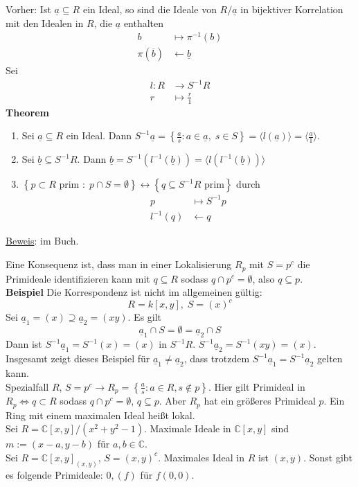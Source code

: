 \documentclass[a4paper, 12pt]{article}
\begin{document}
Vorher: Ist $\underline{a} \subseteq R$ ein Ideal, so sind die Ideale von $R/\underline{a}$ in bijektiver Korrelation mit den Idealen in $R$, die $\underline{a}$ enthalten \begin{align*}
	b & \mapsto \pi^{-1}(b)\\
	\pi(\overline{b}) &\gets \underline{b}
\end{align*}
Sei \begin{align*}
	l: R &\to S^{-1}R\\
	r &\mapsto \frac{r}{1}
\end{align*}
\textbf{Theorem}
\begin{enumerate}
	\item Sei $\underline{a} \subseteq R$ ein Ideal. Dann $S^{-1}\underline{a} = \left\{\frac{a}{s}: a \in \underline{a}, \; s \in S\right\} = \langle l(\underline{a})\rangle = \langle \frac{a}{1} \rangle$.
	\item Sei $\underline{b} \subseteq S^{-1}R$. Dann $\underline{b} = S^{-1}(l^{-1}(\underline{b})) = \langle l(l^{-1}(\underline{b})) \rangle$
	\item $\left\{p \subset R \text{ prim }: \; p \cap S = \emptyset\right\} \leftrightarrow \left\{q \subseteq S^{-1}R \text{ prim}\right\}$ durch \begin{align*}
		p &\mapsto S^{-1}p\\
		l^{-1}(q) &\gets q
	\end{align*}
\end{enumerate}
\underline{Beweis}: im Buch. 

Eine Konsequenz ist, dass man in einer Lokalisierung $R_p$ mit $S = p^c$ die Primideale identifizieren kann mit $q \subseteq R$ sodass $q \cap p^c = \emptyset$, also $q \subseteq p$.\\
\textbf{Beispiel} Die Korrespondenz ist nicht im allgemeinen gültig: \[R = k[x,y], \; S = (x)^c\]
Sei $\underline{a}_1 = (x) \supseteq \underline{a}_2 = (xy)$. Es gilt \[\underline{a}_1 \cap S = \emptyset = \underline{a}_2 \cap S\]
Dann ist $S^{-1}\underline{a}_1 = S^{-1}(x) = (x)$ in $S^{-1}R$. $S^{-1}\underline{a}_2 = S^{-1}(xy) = (x)$. Insgesamt zeigt dieses Beispiel für $\underline{a}_1 \neq \underline{a}_2$, dass trotzdem $S^{-1}\underline{a}_1 = S^{-1}\underline{a}_2$ gelten kann.\\
Spezialfall $R$, $S = p^c \to R_p = \left\{\frac{a}{s}: a \in R, s \notin p\right\}$. Hier gilt Primideal in $R_p \Leftrightarrow q \subset R$ sodass $q \cap p^c = \emptyset$, $q \subseteq p$. Aber $R_p$ hat ein größeres Primideal $p$. Ein Ring mit einem maximalen Ideal heißt lokal.\\
Sei $R = \mathbb{C}[x,y]/(x^2+y^2-1)$. Maximale Ideale in $\mathbb{C}[x,y]$ sind $m := (x-a,y-b)$ für $a,b \in \mathbb{C}$.\\
Sei $R = \mathbb{C}[x,y]_{(x,y)}$, $S = (x,y)^c$. Maximales Ideal in $R$ ist $(x,y)$. Sonst gibt es folgende Primideale: $0, (f)$ für $f(0,0)$.
\end{document}
